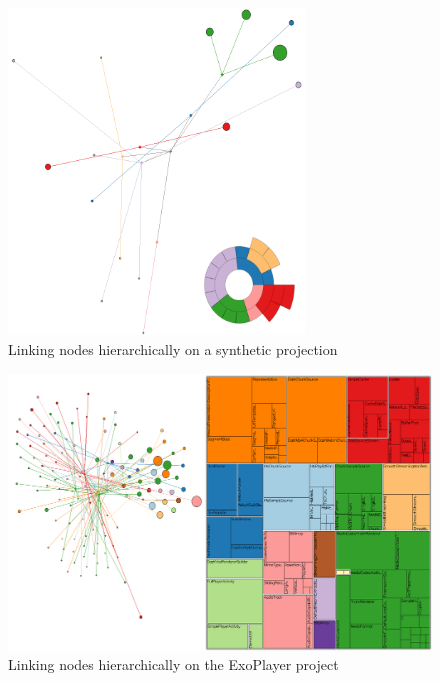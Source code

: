\begin{figure}[H]
	\centering
	\includegraphics[width=0.7\textwidth]{figures/hier_graph_synth.png}
	\caption{Linking nodes hierarchically on a synthetic projection}
	\label{fig:hier_graph_synth}
\end{figure}


\begin{figure}[H]
	\centering
	\includegraphics[width=1.0\textwidth]{figures/hier_sim_graph.png}
	\caption{Linking nodes hierarchically on the ExoPlayer project}
	\label{fig:hier_sim_graph}
\end{figure}


